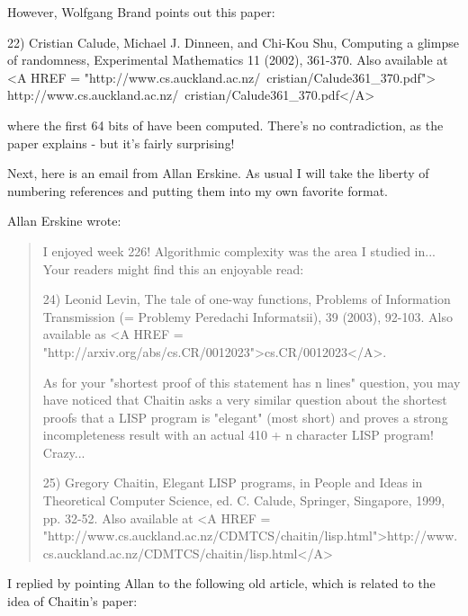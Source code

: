 However, Wolfgang Brand points out this paper:

22) Cristian Calude, Michael J. Dinneen, and Chi-Kou Shu,
Computing a glimpse of randomness,
Experimental Mathematics 11 (2002), 361-370.  Also available at
<A HREF = "http://www.cs.auckland.ac.nz/~cristian/Calude361_370.pdf"> 
http://www.cs.auckland.ac.nz/~cristian/Calude361_370.pdf</A>

where the first 64 bits of \Omega  have been computed.  
There's no contradiction, as the paper explains - but it's
fairly surprising!

Next, here is an email from Allan Erskine.  As usual
I will take the liberty of numbering references and putting
them into my own favorite format.  

Allan Erskine wrote:

\begin{quote}
I enjoyed week 226!  Algorithmic complexity was the area I studied  
in... Your readers might find this an enjoyable read:

24) Leonid Levin, The tale of one-way functions,
Problems of Information Transmission (= Problemy Peredachi Informatsii), 
39 (2003), 92-103.  Also 
available as <A HREF = "http://arxiv.org/abs/cs.CR/0012023">cs.CR/0012023</A>.
 
As for your "shortest proof of this statement has n lines" question,  
you may have noticed that Chaitin asks a very similar question about  
the shortest proofs that a LISP program is "elegant" (most short) and  
proves a strong incompleteness result with an actual 410 + n  
character LISP program!  Crazy...

25) Gregory Chaitin, Elegant LISP programs, in 
People and Ideas in Theoretical Computer Science, ed. C. Calude,
Springer, Singapore, 1999, pp. 32-52.  Also available at
<A HREF = "http://www.cs.auckland.ac.nz/CDMTCS/chaitin/lisp.html">http://www.cs.auckland.ac.nz/CDMTCS/chaitin/lisp.html</A>

\end{quote}
    
I replied by pointing Allan to the following old article,
which is related to the idea of Chaitin's paper:



